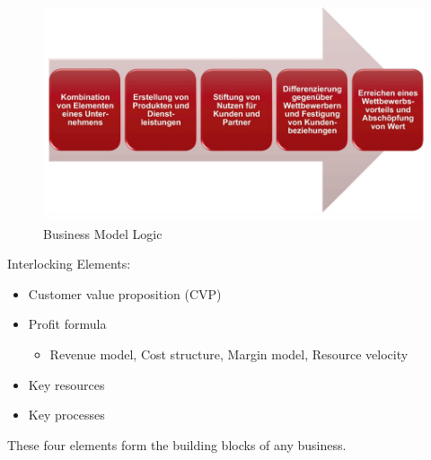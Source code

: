 \documentclass[../Main.tex]{subfiles}
\begin{document}

\begin{figure}[H]
    \centering
    \includegraphics[width=1\linewidth]{Images/digbus/modellogic.png}
    \caption{Business Model Logic}
\end{figure}

Interlocking Elements:
\begin{itemize}
    \item Customer value proposition (CVP)
    \item Profit formula
        \begin{itemize}
            \item Revenue model, Cost structure, Margin model, Resource velocity
        \end{itemize}
    \item Key resources
    \item Key  processes
\end{itemize}
These four elements form the building blocks of any business.
\end{document}
